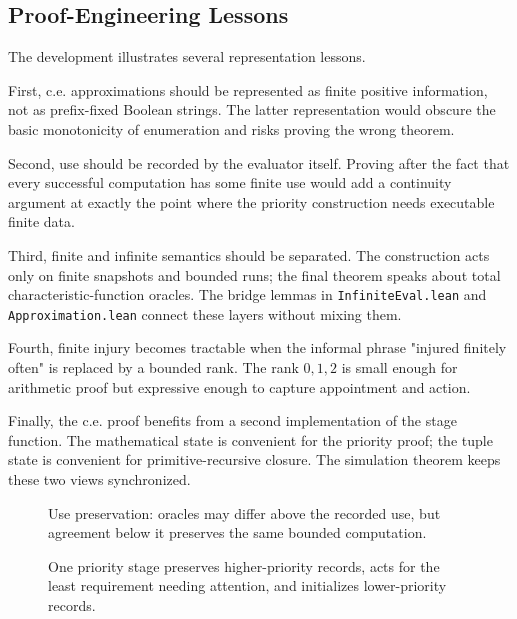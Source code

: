 \subsection{Proof-Engineering Lessons}

The development illustrates several representation lessons.

First, c.e. approximations should be represented as finite positive
information, not as prefix-fixed Boolean strings.  The latter representation
would obscure the basic monotonicity of enumeration and risks proving the
wrong theorem.

Second, use should be recorded by the evaluator itself.  Proving after the
fact that every successful computation has some finite use would add a
continuity argument at exactly the point where the priority construction
needs executable finite data.

Third, finite and infinite semantics should be separated.  The construction
acts only on finite snapshots and bounded runs; the final theorem speaks
about total characteristic-function oracles.  The bridge lemmas in
\texttt{InfiniteEval.lean} and \texttt{Approximation.lean} connect these
layers without mixing them.

Fourth, finite injury becomes tractable when the informal phrase "injured
finitely often" is replaced by a bounded rank.  The rank \(0,1,2\) is small
enough for arithmetic proof but expressive enough to capture appointment
and action.

Finally, the c.e. proof benefits from a second implementation of the stage
function.  The mathematical state is convenient for the priority proof; the
tuple state is convenient for primitive-recursive closure.  The simulation
theorem keeps these two views synchronized.

\begin{figure}
\centering

\caption{Use preservation: oracles may differ above the recorded use, but
agreement below it preserves the same bounded computation.}
\end{figure}

\begin{figure}
\centering

\caption{One priority stage preserves higher-priority records, acts for
the least requirement needing attention, and initializes lower-priority
records.}
\end{figure}


